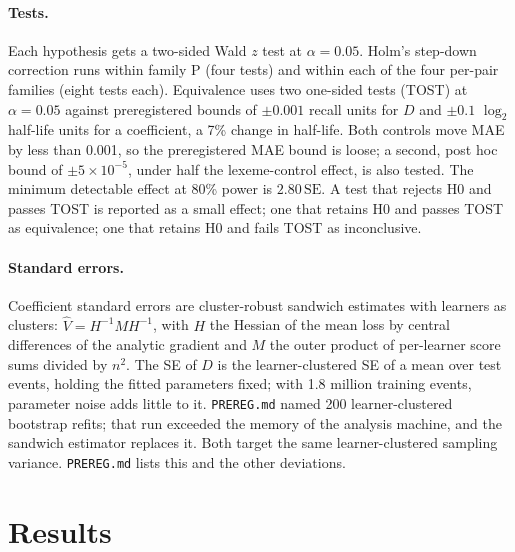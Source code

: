 \documentclass[11pt]{article}
\begin{document}
\paragraph{Tests.} Each hypothesis gets a two-sided Wald $z$ test at
$\alpha = 0.05$. Holm's step-down correction runs within family P (four
tests) and within each of the four per-pair families (eight tests each).
Equivalence uses two one-sided tests (TOST) at $\alpha=0.05$ against
preregistered bounds of $\pm 0.001$ recall units for $D$ and $\pm 0.1$ $\log_2$
half-life units for a coefficient, a 7\% change in half-life. Both
controls move MAE by less than 0.001, so the preregistered MAE bound is
loose; a second, post hoc bound of $\pm5\times10^{-5}$, under half the
lexeme-control effect, is also tested. The
minimum detectable effect at 80\% power is $2.80\,\mathrm{SE}$. A test
that rejects H0 and passes TOST is reported as a small effect; one that
retains H0 and passes TOST as equivalence; one that retains H0 and fails
TOST as inconclusive.

\paragraph{Standard errors.} Coefficient standard errors are
cluster-robust sandwich estimates with learners as clusters:
$\hat V = H^{-1} M H^{-1}$, with $H$ the Hessian of the mean loss by
central differences of the analytic gradient and $M$ the outer product
of per-learner score sums divided by $n^2$. The SE of $D$ is the
learner-clustered SE of a mean over test events, holding the fitted
parameters fixed; with 1.8 million training events, parameter noise
adds little to it. \texttt{PREREG.md} named 200 learner-clustered
bootstrap refits; that run exceeded the memory of the analysis machine,
and the sandwich estimator replaces it. Both target the same
learner-clustered sampling variance. \texttt{PREREG.md} lists this and
the other deviations.

\section{Results}
\label{sec:results}

\begin{table}[htbp]
  \centering
  \scriptsize
  \setlength{\tabcolsep}{2pt}
  \caption{Held-out fit per language pair, interface language first.
    $\Delta$MAE is cognate or lexeme model minus base, $\times 10^{3}$,
    with its 95\% interval.}
  \label{tab:fit}
\end{table}
\end{document}
